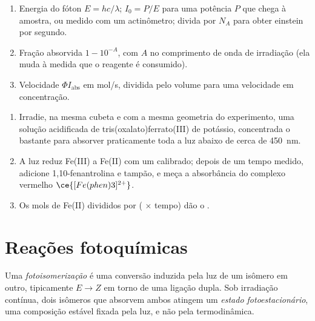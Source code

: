 \begin{method}\label{met:b3:photochemistry:photochemical-rate}
\begin{enumerate}
  \item Energia do fóton $E = hc/\lambda$;  $I_0 = P/E$ para uma potência $P$ que
        chega à amostra, ou medido com um actinômetro; divida por $N_A$ para obter
        einstein por segundo.
  \item Fração absorvida $1 - 10^{-A}$, com $A$ no comprimento de onda de irradiação (ela
        muda à medida que o reagente é consumido).
  \item Velocidade $\Phi I_{\mathrm{abs}}$ em mol/s, dividida pelo volume para uma velocidade em concentração.
\end{enumerate}
\end{method}

\begin{method}\label{met:b3:photochemistry:actinometry}
\begin{enumerate}
  \item Irradie, na mesma cubeta e com a mesma geometria do experimento, uma solução
        acidificada de tris(oxalato)ferrato(III) de potássio, concentrada o bastante
        para absorver praticamente toda a luz abaixo de cerca de \qty{450}{nm}.
  \item A luz reduz Fe(III) a Fe(II) com um  calibrado; depois
        de um tempo medido, adicione 1,10-fenantrolina e tampão, e meça a
        absorbância do complexo vermelho $\ce{[Fe(phen)3]^{2+}}$.
  \item Os mols de Fe(II) divididos por ( $\times$ tempo) dão o .
\end{enumerate}
\end{method}

\section{Reações fotoquímicas}

\begin{definition}\label{def:b3:photochemistry:photoisomerisation}
Uma \emph{fotoisomerização} é uma conversão
induzida pela luz de um isômero em outro, tipicamente $E \to Z$ em torno de uma
ligação dupla. Sob irradiação contínua, dois isômeros que absorvem ambos atingem um
\emph{estado fotoestacionário}, uma composição estável
fixada pela luz, e não pela termodinâmica.
\end{definition}

